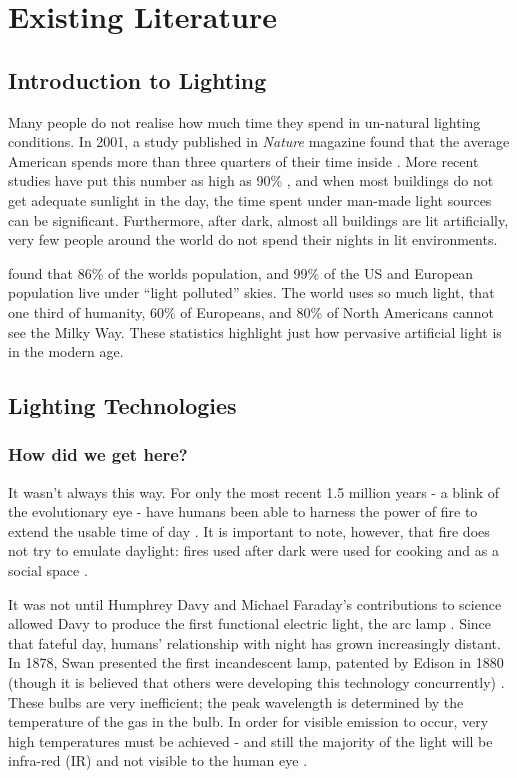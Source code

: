 
\chapter{Existing Literature}
\label{Chap:Lit}

\section{Introduction to Lighting}
\label{sec:LitIntro}

Many people do not realise how much time they spend in un-natural lighting conditions. In 2001, a study published in \textit{Nature} magazine found that the average American spends more than three quarters of their time inside \citep{klepeisNationalHumanActivity2001}. More recent studies have put this number as high as 90\% \citep{opiniumBritsSpend902018}, and when most buildings do not get adequate sunlight in the day, the time spent under man-made light sources can be significant. Furthermore, after dark, almost all buildings are lit artificially, very few people around the world do not spend their nights in lit environments.

\citet{falchiNewWorldAtlas2016} found that 86\% of the worlds population, and 99\% of the US and European population live under ``light polluted'' skies. The world uses so much light, that one third of humanity, 60\% of Europeans, and 80\% of North Americans cannot see the Milky Way. These statistics highlight just how pervasive artificial light is in the modern age.


\section{Lighting Technologies}

\subsection{How did we get here?}

It wasn't always this way. For only the most recent 1.5 million years - a blink of the evolutionary eye - have humans been able to harness the power of fire to extend the usable time of day \citep{gowlettEarliestFireAfrica2013}. It is important to note, however, that fire does not try to emulate daylight: fires used after dark were used for cooking and as a social space \citep{gowlettDiscoveryFireHumans2016}.

It was not until Humphrey Davy and Michael Faraday's contributions to science allowed Davy to produce the first functional electric light, the arc lamp \citep{knightHumphryDavyScience1998}. Since that fateful day, humans' relationship with night has grown increasingly distant. In 1878, Swan presented the first  incandescent lamp, patented by Edison in 1880 (though it is believed that others were developing this technology concurrently) \citep{montoyaIndoorLightingTechniques2017a}. These bulbs are very inefficient; the peak wavelength is determined by the temperature of the gas in the bulb. In order for visible emission to occur, very high temperatures must be achieved - and still the majority of the light will be infra-red (IR) and not visible to the human eye \citep{montoyaIndoorLightingTechniques2017a}.

